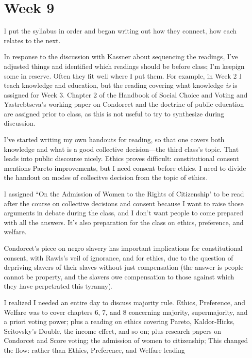
\section{Week 9}

I put the syllabus in order and began writing out how they connect, how each relates to the next.

In response to the discussion with Kassner about sequencing the readings, I've adjusted things and identified which readings should be before class; I'm keepign some in reserve.  Often they fit well where I put them.  For example, in Week 2 I teach knowledge and education, but the reading covering what knowledge \textit{is} is assigned for Week 3.  Chapter 2 of the Handbook of Social Choice and Voting \autocite{Heckelman2015} and Yastrebtseva's working paper on Condorcet and the doctrine of public education \autocite{Yastrebtseva2015} are assigned prior to class, as this is not useful to try to synthesize during discussion.

I've started writing my own handouts for reading, so that one covers both knowledge and what is a good collective decision—the third class's topic.  That leads into public discourse nicely.  Ethics proves difficult:  constitutional consent mentions Pareto improvements, but I need consent before ethics.  I need to divide the handout on modes of collecitve decision from the topic of ethics.

I assigned ``On the Admission of Women to the Rights of Citizenship' \autocite{Condorcet1789} to be read after the course on collective decisions and consent because I want to raise those arguments in debate during the class, and I don't want people to come prepared with all the answers.  It's also preparation for the class on ethics, preference, and welfare.

Condorcet's piece on negro slavery \autocite{Condorcet1781} has important implications for constitutional consent, with Rawls's veil of ignorance, and for ethics, due to the question of depriving slavers of their slaves without just compensation (the answer is people cannot be property, and the slavers owe compensation to those against which they have perpetrated this tyranny).

I realized I needed an entire day to discuss majority rule.  Ethics, Preference, and Welfare was to cover chapters 6, 7, and 8 concerning majority, supermajority, and a priori voting power; plus a reading on ethics covering Pareto, Kaldor-Hicks, Scitovsky's Double, the income effect, and so on; plus research papers on Condorcet and Score voting; the admission of women to citizenship; This changed the flow:  rather than Ethics, Preference, and Welfare leading